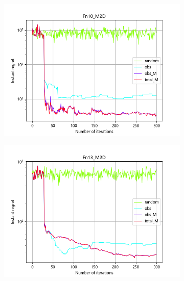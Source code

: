\documentclass{article}
\begin{document}
\begin{figure}[H]
\begin{subfigure}[t]{.32\linewidth}
        \includegraphics[width=1\textwidth]{pictures/Homo_noise_2D/M/Fn10_M2D_ins.png}
    \end{subfigure}
    \begin{subfigure}[t]{.32\linewidth}
        \centering
        \includegraphics[width=1\textwidth]{pictures/Homo_noise_2D/M/Fn13_M2D_ins.png}
    \end{subfigure}
    \begin{subfigure}[t]{.32\linewidth}
        \centering

\end{subfigure}
\end{figure}
\end{document}
